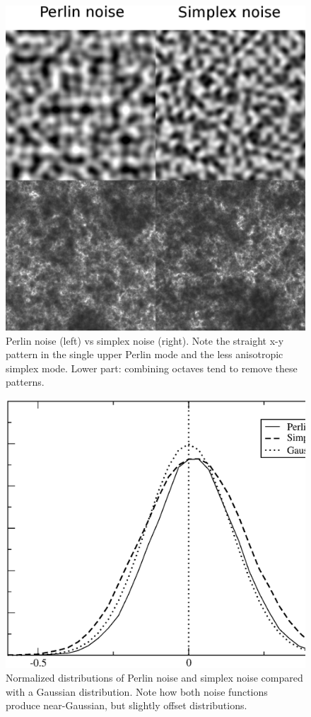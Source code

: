 \documentclass[aps,pre,twocolumn,letterpaper,floatfix,showpacs]{revtex4}
\begin{document}
\begin{figure}
\includegraphics[width=.5\textwidth]{noise.eps}
\caption{Perlin noise (left) vs simplex noise (right). Note the
  straight x-y pattern in the single upper Perlin mode and the less
  anisotropic simplex mode. Lower part: combining octaves tend
  to remove these patterns.}
\label{fig:noise}
\end{figure}

\begin{figure}
\includegraphics[width=.5\textwidth]{perlinstats.eps}
\caption{Normalized distributions of Perlin noise and simplex noise compared with a
  Gaussian distribution. Note how both noise functions produce
  near-Gaussian, but slightly offset distributions.}
\label{fig:properties}
\end{figure}
\end{document}

